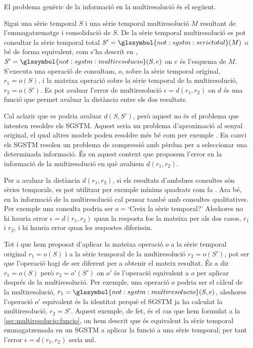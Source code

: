 El problema genèric de la informació en la multiresolució és el següent.
\begin{definition}
  Sigui una sèrie temporal $S$ i una sèrie temporal multiresolució $M$
  resultant de l'emmagatzematge i consolidació de $S$. De la sèrie
  temporal multiresolució es pot consultar la sèrie temporal total
  $S'=\glssymbol{not:sgstm:serietotal}(M)$ o bé de forma equivalent,
  com s'ha descrit en ,
  $S'=\glssymbol{not:sgstm:multiresolucio}(S,e)$ on $e$ és l'esquema
  de $M$.  S'executa una operació de consultam, $o$, sobre la sèrie
  temporal original, $r_1=o(S)$, i la mateixa operació sobre la sèrie
  temporal de la multiresolució, $r_2=o(S')$. Es pot avaluar l'error
  de multiresolució $\epsilon=d(r_1,r_2)$ on $d$ és una funció que
  permet avaluar la distància entre els dos resultats.
\end{definition}


Cal aclarir que es podria avaluar $d(S,S')$, però aquest no és el
problema que intenten resoldre els \gls{SGSTM}. Aquest seria un
problema d'aproximació al senyal original, el qual altres models poden
resoldre més bé com per exemple \textcite{last01,ogras06}. En canvi
els \gls{SGSTM} resolen un problema de compressió amb pèrdua per a
seleccionar una determinada informació. És en aquest context que
proposem l'error en la informació de la multiresolució en què avaluem
$d(r_1,r_2)$.



Per a avaluar la distància $d(r_1,r_2)$, si els resultats d'ambdues
consultes són sèries temporals, es pot utilitzar per exemple mínims
quadrats com fa \textcite{last01}.  Ara bé, en la informació de la
multiresolució cal pensar també amb consultes qualitatives. Per
exemple una consulta podria ser $o=$`Creix la sèrie temporal?'
Aleshores no hi hauria error $\epsilon=d(r_1,r_2)$ quan la resposta
fos la mateixa per als dos casos, $r_1$ i $r_2$, i hi hauria error
quan les respostes diferissin.


Tot i que hem proposat d'aplicar la mateixa operació $o$ a la sèrie
temporal original $r_1=o(S)$ i a la sèrie temporal de la
multiresolució $r_2=o(S')$, pot ser que l'operació hagi de ser
diferent per a obtenir el mateix resultat. És a dir $r_1=o(S)$ però
$r_2=o'(S')$ on $o'$ és l'operació equivalent a $o$ per aplicar
després de la multiresolució.  Per exemple, una operació $o$ podria
ser el càlcul de la multiresolució,
$r_1=\glssymbol{not:sgstm:multiresolucio}(S,e)$, aleshores l'operació
$o'$ equivalent és la identitat perquè el \gls{SGSTM} ja ha calculat
la multiresolució, $r_2=S'$. Aquest exemple, de fet, és el cas que hem
formulat a la \autoref{sec:multiresolucio:funcio}, on hem descrit que
és equivalent la sèrie temporal emmagatzemada en un \gls{SGSTM} a
aplicar la funció  a una sèrie
temporal; per tant l'error $\epsilon =d(r_1,r_2)$ seria nul.



